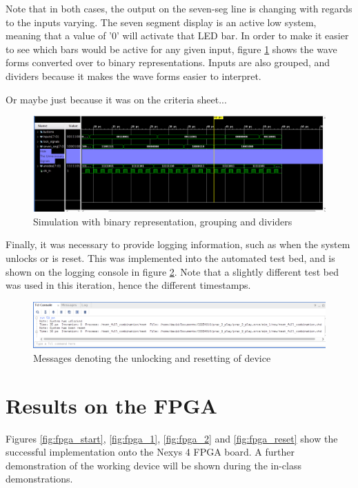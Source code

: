 \documentclass[12pt,a4paper]{article}
\begin{document}
Note that in both cases, the output on the seven-seg line is changing with regards to the inputs varying. The seven segment display is an active low system, meaning that a value of '0' will activate that LED bar. In order to make it easier to see which bars would be active for any given input, figure \ref{fig:binary} shows the wave forms converted over to binary representations. Inputs are also grouped, and dividers because it makes the wave forms easier to interpret.

Or maybe just because it was on the criteria sheet...

\begin{figure}[H]
    \centering
    \includegraphics[scale=0.25]{images/binary_grouping.png}
    \caption{Simulation with binary representation, grouping and dividers}
    \label{fig:binary}
\end{figure}

Finally, it was necessary to provide logging information, such as when the system unlocks or is reset. This was implemented into the automated test bed, and is shown on the logging console in figure \ref{fig:messages}. Note that a slightly different test bed was used in this iteration, hence the different timestamps.

\begin{figure}[H]
    \centering
    \includegraphics[scale=0.25]{images/messages.png}
    \caption{Messages denoting the unlocking and resetting of device}
    \label{fig:messages}
\end{figure}

\section{Results on the FPGA}

Figures \ref{fig:fpga_start}, \ref{fig:fpga_1}, \ref{fig:fpga_2} and \ref{fig:fpga_reset} show the successful implementation onto the Nexys 4 FPGA board. A further demonstration of the working device will be shown during the in-class demonstrations.
\end{document}
